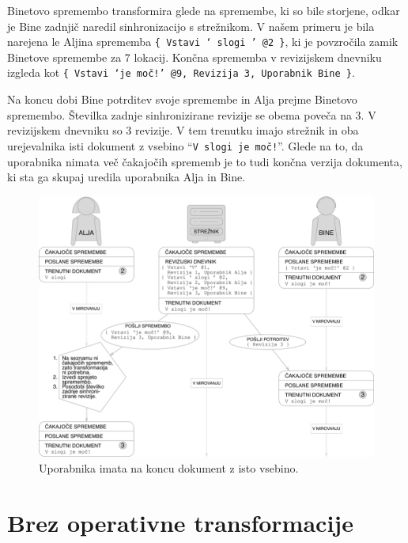 \documentclass[a4paper, 12pt, twoside]{book}
\begin{document}
Binetovo spremembo transformira glede na spremembe, ki so bile storjene, odkar je Bine zadnjič naredil sinhronizacijo s strežnikom. V našem primeru je bila narejena le Aljina sprememba {\tt \{ Vstavi ‘ slogi ’ @2 \}}, ki je povzročila zamik Binetove spremembe za 7 lokacij. Končna sprememba v revizijskem dnevniku izgleda kot {\tt \{ Vstavi ‘je moč!’ @9, Revizija 3, Uporabnik Bine \}}.

Na koncu dobi Bine potrditev svoje spremembe in Alja prejme Binetovo spremembo. Številka zadnje sinhronizirane revizije se obema poveča na 3. V revizijskem dnevniku so 3 revizije. V tem trenutku imajo strežnik in oba urejevalnika isti dokument z vsebino “{\tt V slogi je moč!}”. Glede na to, da uporabnika nimata več čakajočih sprememb je to tudi končna verzija dokumenta, ki sta ga skupaj uredila uporabnika Alja in Bine.

\begin{figure}[placement h]
\begin{center}
\includegraphics[width=16cm]{img/pc6.pdf}
\end{center}
\caption{Uporabnika imata na koncu dokument z isto vsebino.}
\label{pc6}
\end{figure}

\pagebreak

\section{Brez operativne transformacije}
\label{sec:woot}
\end{document}
